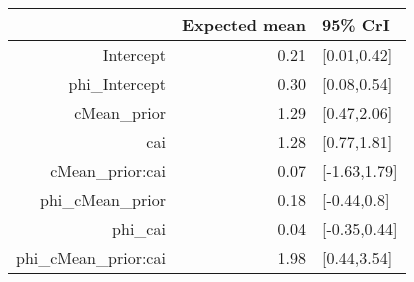 \begin{tabular}{rrl}
  \hline
 & Expected mean & 95\% CrI \\ 
  \hline
Intercept & 0.21 & [0.01,0.42] \\ 
  phi\_Intercept & 0.30 & [0.08,0.54] \\ 
  cMean\_prior & 1.29 & [0.47,2.06] \\ 
  cai & 1.28 & [0.77,1.81] \\ 
  cMean\_prior:cai & 0.07 & [-1.63,1.79] \\ 
  phi\_cMean\_prior & 0.18 & [-0.44,0.8] \\ 
  phi\_cai & 0.04 & [-0.35,0.44] \\ 
  phi\_cMean\_prior:cai & 1.98 & [0.44,3.54] \\ 
   \hline
\end{tabular}

